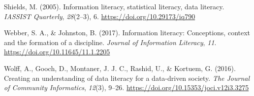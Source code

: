 \documentclass[
  12pt,
  a4paper,
  twoside]{article}
\newlength{\cslhangindent}
\newenvironment{CSLReferences}[2] %
 {\begin{list}{}{%
  \setlength{\itemindent}{0pt}
  \setlength{\leftmargin}{0pt}
  \setlength{\parsep}{0pt}
  \ifodd #1
   \setlength{\leftmargin}{\cslhangindent}
   \setlength{\itemindent}{-1\cslhangindent}
  \fi
  \setlength{\itemsep}{#2\baselineskip}}}
 {\end{list}}
\begin{document}
\begin{CSLReferences}{1}{0}
Shields, M. (2005). Information literacy, statistical literacy, data literacy. \emph{IASSIST Quarterly}, \emph{28}(2--3), 6. \url{https://doi.org/10.29173/iq790}

Webber, S. A., \& Johnston, B. (2017). Information literacy: Conceptions, context and the formation of a discipline. \emph{Journal of Information Literacy}, \emph{11}. \url{https://doi.org/10.11645/11.1.2205}

Wolff, A., Gooch, D., Montaner, J. J. C., Rashid, U., \& Kortuem, G. (2016). Creating an understanding of data literacy for a data-driven society. \emph{The Journal of Community Informatics}, \emph{12}(3), 9--26. \url{https://doi.org/10.15353/joci.v12i3.3275}

\end{CSLReferences}
\end{document}
